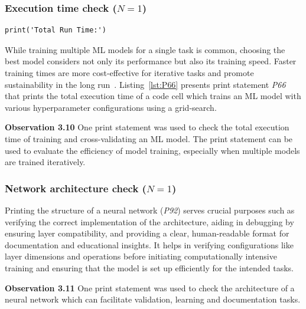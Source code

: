 \documentclass[smallextended]{svjour3}       %
\newcommand{\highlight}[1]{\begin{framed}%
  \noindent#1
\end{framed}}
\providecommand{\DIFaddbegin}{} %
\providecommand{\DIFaddend}{} %
\providecommand{\DIFdelbegin}{} %
\providecommand{\DIFdelend}{} %
\newcommand{\DIFscaledelfig}{0.5}
\newlength{\DIFdelgraphicswidth} %
\newlength{\DIFdelgraphicsheight} %
\newcommand{\DIFaddincludegraphics}[2][]{{\color{blue}\fbox{\DIFOincludegraphics[#1]{#2}}}} %
\newcommand{\DIFdelincludegraphics}[2][]{%
\sbox{\DIFdelgraphicsbox}{\DIFOincludegraphics[#1]{#2}}%
\settoboxwidth{\DIFdelgraphicswidth}{\DIFdelgraphicsbox} %
\settoboxtotalheight{\DIFdelgraphicsheight}{\DIFdelgraphicsbox} %
\scalebox{\DIFscaledelfig}{%
\parbox[b]{\DIFdelgraphicswidth}{\usebox{\DIFdelgraphicsbox}\\[-\baselineskip] \rule{\DIFdelgraphicswidth}{0em}}\llap{\resizebox{\DIFdelgraphicswidth}{\DIFdelgraphicsheight}{%
\setlength{\unitlength}{\DIFdelgraphicswidth}%
\begin{picture}(1,1)%
\thicklines\linethickness{2pt} %
{\color[rgb]{1,0,0}\put(0,0){\framebox(1,1){}}}%
{\color[rgb]{1,0,0}\put(0,0){\line( 1,1){1}}}%
{\color[rgb]{1,0,0}\put(0,1){\line(1,-1){1}}}%
\end{picture}%
}\hspace*{3pt}}} %
} %
\DeclareRobustCommand{\DIFaddbegin}{\DIFOaddbegin \let\includegraphics\DIFaddincludegraphics} %
\DeclareRobustCommand{\DIFaddend}{\DIFOaddend \let\includegraphics\DIFOincludegraphics} %
\DeclareRobustCommand{\DIFdelbegin}{\DIFOdelbegin \let\includegraphics\DIFdelincludegraphics} %
\DeclareRobustCommand{\DIFdelend}{\DIFOaddend \let\includegraphics\DIFOincludegraphics} %
\begin{document}
\subsubsection{Execution time check ($N = 1$)}
\begin{lstlisting}[caption={Print statement \emph{P66} used to check the total execution time of training an ML model with various hyper-parameter configurations.}, label={lst:P66}]
print('Total Run Time:')
\end{lstlisting}

While training multiple ML models for a single task is common, choosing the best model considers not only its performance but also its training speed. Faster training times are more cost-effective for iterative tasks and promote sustainability in the long run~\citep{shome2022data}. Listing~\ref{lst:P66} presents print statement \emph{P66} that prints the total execution time of a code cell which trains an ML model with various hyperparameter configurations using a grid-search.

\DIFdelbegin %
\DIFdelend \DIFaddbegin \highlight{\textbf{Observation 3.10} One print statement was used to check the total execution time of training and cross-validating an ML model. The print statement can be used to evaluate the efficiency of model training, especially when multiple models are trained iteratively.}
\DIFaddend 

\subsubsection{Network architecture check ($N = 1$)}

Printing the structure of a neural network (\emph{P92}) serves crucial purposes such as verifying the correct implementation of the architecture, aiding in debugging by ensuring layer compatibility, and providing a clear, human-readable format for documentation and educational insights. It helps in verifying configurations like layer dimensions and operations before initiating computationally intensive training and ensuring that the model is set up efficiently for the intended tasks.

\DIFdelbegin %
\DIFdelend \DIFaddbegin \highlight{\textbf{Observation 3.11} One print statement was used to check the architecture of a neural network which can facilitate validation, learning and documentation tasks.}
\DIFaddend 
\end{document}
